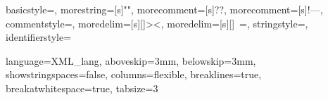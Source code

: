 \usepackage{listings}
\usepackage{color}



 {
  basicstyle=\ttfamily,
  morestring=[s]{"}{"},
  morecomment=[s]{?}{?},
  morecomment=[s]{!--}{--},
  commentstyle=\color{darkgreen},
  moredelim=[s][\color{black}]{>}{<},
  moredelim=[s][\color{red}]{\ }{=},
  stringstyle=\color{blue},
  identifierstyle=\color{maroon}
}

 {
	language=XML_lang,
	aboveskip=3mm,
  belowskip=3mm,
  showstringspaces=false,
  columns=flexible,
  breaklines=true,
  breakatwhitespace=true,
	tabsize=3
}